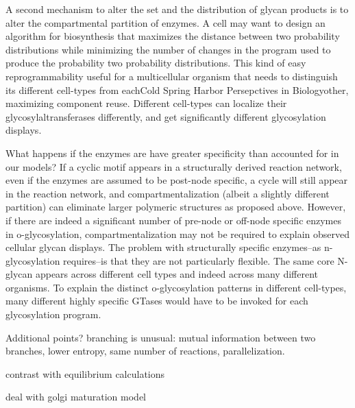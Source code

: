 \documentclass[twocolumn]{article}
\begin{document}
A second mechanism to alter the set and the distribution of glycan products is to alter the compartmental partition of enzymes. A cell may want to design an algorithm for biosynthesis that maximizes the distance between two probability distributions while minimizing the number of changes in the program used to produce the probability two probability distributions. This kind of easy reprogrammability useful for a multicellular organism that needs to distinguish its different cell-types from eachCold Spring Harbor Persepctives in Biologyother, maximizing component reuse. Different cell-types can localize their glycosylaltransferases differently, and get significantly different glycosylation displays. 

What happens if the enzymes are have greater specificity than accounted for in our models? If a cyclic motif appears in a structurally derived reaction network, even if the enzymes are assumed to be post-node specific, a cycle will still appear in the reaction network, and compartmentalization (albeit a slightly different partition) can eliminate larger polymeric structures as proposed above. However, if there are indeed a significant number of pre-node or off-node specific enzymes in o-glycosylation, compartmentalization may not be required to explain observed cellular glycan displays. The problem with structurally specific enzymes--as n-glycosylation requires--is that they are not particularly flexible. The same core N-glycan appears across different cell types and indeed across many different organisms. To explain the distinct o-glycosylation patterns in different cell-types, many different highly specific GTases would have to be invoked for each glycosylation program. 

Additional points?
branching is unusual: mutual information between two branches, lower entropy, same number of reactions, parallelization. 

contrast with equilibrium calculations

deal with golgi maturation model

 
\end{document}
